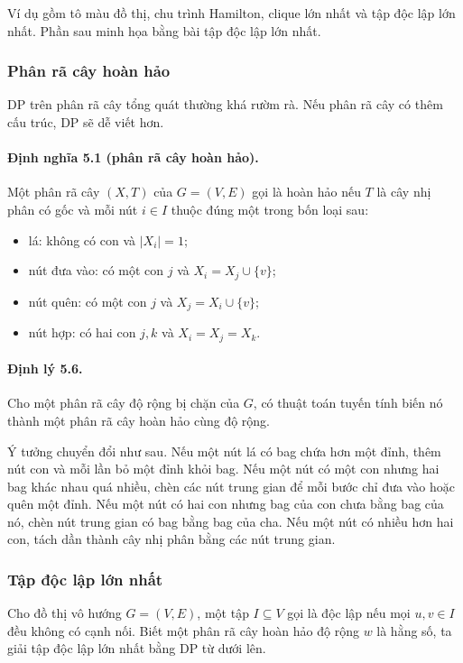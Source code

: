 \documentclass[11pt]{article}
\begin{document}
Ví dụ gồm tô màu đồ thị, chu trình Hamilton, clique lớn nhất và tập độc lập lớn
nhất. Phần sau minh họa bằng bài tập độc lập lớn nhất.

\subsubsection{Phân rã cây hoàn hảo}

DP trên phân rã cây tổng quát thường khá rườm rà. Nếu phân rã cây có thêm cấu
trúc, DP sẽ dễ viết hơn.

\paragraph{Định nghĩa 5.1 (phân rã cây hoàn hảo).}
Một phân rã cây $(X,T)$ của $G=(V,E)$ gọi là hoàn hảo nếu $T$ là cây nhị phân
có gốc và mỗi nút $i\in I$ thuộc đúng một trong bốn loại sau:
\begin{itemize}
  \item lá: không có con và $|X_i|=1$;
  \item nút đưa vào: có một con $j$ và $X_i=X_j\cup\{v\}$;
  \item nút quên: có một con $j$ và $X_j=X_i\cup\{v\}$;
  \item nút hợp: có hai con $j,k$ và $X_i=X_j=X_k$.
\end{itemize}

\paragraph{Định lý 5.6.}
Cho một phân rã cây độ rộng bị chặn của $G$, có thuật toán tuyến tính biến nó
thành một phân rã cây hoàn hảo cùng độ rộng.

Ý tưởng chuyển đổi như sau. Nếu một nút lá có bag chứa hơn một đỉnh, thêm nút
con và mỗi lần bỏ một đỉnh khỏi bag. Nếu một nút có một con nhưng hai bag khác
nhau quá nhiều, chèn các nút trung gian để mỗi bước chỉ đưa vào hoặc quên một
đỉnh. Nếu một nút có hai con nhưng bag của con chưa bằng bag của nó, chèn nút
trung gian có bag bằng bag của cha. Nếu một nút có nhiều hơn hai con, tách dần
thành cây nhị phân bằng các nút trung gian.

\subsubsection{Tập độc lập lớn nhất}

Cho đồ thị vô hướng $G=(V,E)$, một tập $I\subseteq V$ gọi là độc lập nếu mọi
$u,v\in I$ đều không có cạnh nối. Biết một phân rã cây hoàn hảo độ rộng $w$ là
hằng số, ta giải tập độc lập lớn nhất bằng DP từ dưới lên.
\end{document}
